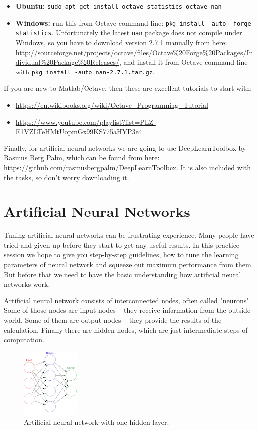 \documentclass[a4paper,11pt]{article}
\begin{document}
\begin{itemize}
	\item \textbf{Ubuntu:} \texttt{sudo apt-get install octave-statistics octave-nan}
	\item \textbf{Windows:} run this from Octave command line: \texttt{pkg install -auto -forge statistics}. Unfortunately the latest \texttt{nan} package does not compile under Windows, so you have to download version 2.7.1 manually from here: \url{http://sourceforge.net/projects/octave/files/Octave%20Forge%20Packages/Individual%20Package%20Releases/}, and install it from Octave command line with \texttt{pkg install -auto nan-2.7.1.tar.gz}.
\end{itemize}

If you are new to Matlab/Octave, then these are excellent tutorials to start with:
\begin{itemize}
	\item \url{https://en.wikibooks.org/wiki/Octave_Programming_Tutorial}
	\item \url{https://www.youtube.com/playlist?list=PLZ-E1VZLTeHMtUopmGx99KS775aHYP3e4}
\end{itemize}

Finally, for artificial neural networks we are going to use DeepLearnToolbox by Rasmus Berg Palm, which can be found from here: \url{https://github.com/rasmusbergpalm/DeepLearnToolbox}. It is also included with the tasks, so don't worry downloading it.

%
%
\section{Artificial Neural Networks}

Tuning artificial neural networks can be frustrating experience. Many people have tried and given up before they start to get any useful results. In this practice session we hope to give you step-by-step guidelines, how to tune the learning parameters of neural network and squeeze out  maximum performance from them. But before that we need to have the basic understanding how artificial neural networks work.

Artificial neural network consists of interconnected nodes, often called "neurons". Some of those nodes are input nodes -- they receive information from the outside world. Some of them are output nodes -- they provide the results of the calculation. Finally there are hidden nodes, which are just intermediate steps of computation.

\begin{figure}[h]
	\centering
	\includegraphics[width=0.25\textwidth]{ann.png}
	\caption{Artificial neural network with one hidden layer.}
\end{figure}
\end{document}
